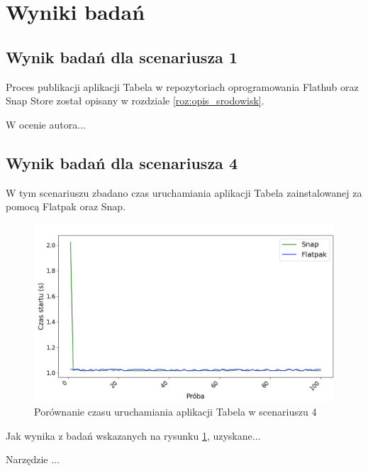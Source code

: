 \section{Wyniki badań}

\subsection{Wynik badań dla scenariusza 1}

Proces publikacji aplikacji Tabela w repozytoriach oprogramowania Flathub oraz Snap Store został opisany w rozdziale \ref{roz:opis_srodowisk}.

W ocenie autora...


\subsection{Wynik badań dla scenariusza 4}

W tym scenariuszu zbadano czas uruchamiania aplikacji Tabela zainstalowanej za pomocą Flatpak oraz Snap.


\begin{figure}[ht]
    \centering
    \includegraphics[width=\linewidth]{img/wykresy/czas_wlaczania_4.png}
    \caption{Porównanie czasu uruchamiania aplikacji Tabela w scenariuszu 4}
    \label{wykres:startup}
\end{figure}

Jak wynika z badań wskazanych na rysunku \ref{wykres:startup}, uzyskane...

Narzędzie \cite{hyperfine}...